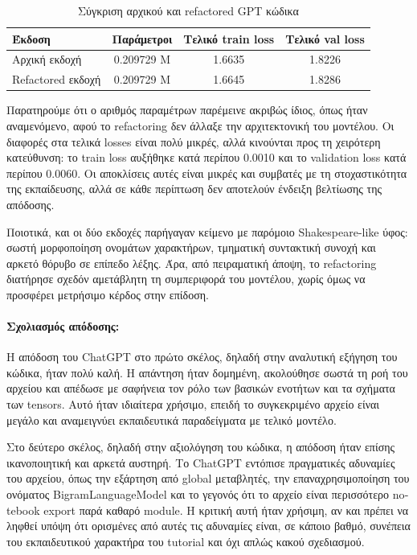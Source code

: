 \documentclass[11pt,a4paper]{article}
\begin{document}
\begin{table}[H]
  \centering
  \caption{Σύγκριση αρχικού και \textlatin{refactored} \textlatin{GPT} κώδικα}
  \begin{tabular}{lccc}
    \toprule
    \textbf{Έκδοση} & \textbf{Παράμετροι} & \textbf{Τελικό \textlatin{train loss}} & \textbf{Τελικό \textlatin{val loss}} \\
    \midrule
    Αρχική εκδοχή & 0.209729 M & 1.6635 & 1.8226 \\
    \textlatin{Refactored} εκδοχή & 0.209729 M & 1.6645 & 1.8286 \\
    \bottomrule
  \end{tabular}
\end{table}

Παρατηρούμε ότι ο αριθμός παραμέτρων παρέμεινε ακριβώς ίδιος, όπως ήταν αναμενόμενο, αφού το
\textlatin{refactoring} δεν άλλαξε την αρχιτεκτονική του μοντέλου. Οι διαφορές στα τελικά \textlatin{losses}
είναι πολύ μικρές, αλλά κινούνται προς τη χειρότερη κατεύθυνση: το \textlatin{train loss} αυξήθηκε κατά περίπου
0.0010 και το \textlatin{validation loss} κατά περίπου 0.0060. Οι αποκλίσεις αυτές είναι μικρές και συμβατές
με τη στοχαστικότητα της εκπαίδευσης, αλλά σε κάθε περίπτωση δεν αποτελούν ένδειξη βελτίωσης της απόδοσης.

Ποιοτικά, και οι δύο εκδοχές παρήγαγαν κείμενο με παρόμοιο \textlatin{Shakespeare-like} ύφος:
σωστή μορφοποίηση ονομάτων χαρακτήρων, τμηματική συντακτική συνοχή και αρκετό θόρυβο σε επίπεδο λέξης.
Άρα, από πειραματική άποψη, το \textlatin{refactoring} διατήρησε σχεδόν αμετάβλητη τη συμπεριφορά του μοντέλου,
χωρίς όμως να προσφέρει μετρήσιμο κέρδος στην επίδοση.

\paragraph{Σχολιασμός απόδοσης:}

Η απόδοση του \textlatin{ChatGPT} στο πρώτο σκέλος, δηλαδή στην αναλυτική εξήγηση του κώδικα, ήταν πολύ καλή.
Η απάντηση ήταν δομημένη, ακολούθησε σωστά τη ροή του αρχείου και απέδωσε με σαφήνεια τον ρόλο των βασικών
ενοτήτων και τα σχήματα των \textlatin{tensors}. Αυτό ήταν ιδιαίτερα χρήσιμο, επειδή το συγκεκριμένο αρχείο
είναι μεγάλο και αναμειγνύει εκπαιδευτικά παραδείγματα με τελικό μοντέλο.

Στο δεύτερο σκέλος, δηλαδή στην αξιολόγηση του κώδικα, η απόδοση ήταν επίσης ικανοποιητική και αρκετά αυστηρή.
Το \textlatin{ChatGPT} εντόπισε πραγματικές αδυναμίες του αρχείου, όπως την εξάρτηση από global μεταβλητές,
την επαναχρησιμοποίηση του ονόματος \textlatin{BigramLanguageModel} και το γεγονός ότι το αρχείο είναι περισσότερο
\textlatin{notebook export} παρά καθαρό \textlatin{module}. Η κριτική αυτή ήταν χρήσιμη, αν και πρέπει να
ληφθεί υπόψη ότι ορισμένες από αυτές τις αδυναμίες είναι, σε κάποιο βαθμό, συνέπεια του εκπαιδευτικού χαρακτήρα
του tutorial και όχι απλώς κακού σχεδιασμού.
\end{document}
